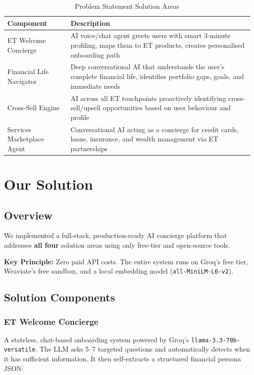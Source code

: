\documentclass[12pt,a4paper]{article}
\begin{document}
\begin{table}[H]
\centering
\caption{Problem Statement Solution Areas}
\begin{tabularx}{\textwidth}{lX}
\toprule
\textbf{Component} & \textbf{Description} \\
\midrule
ET Welcome Concierge & AI voice/chat agent greets users with smart 3-minute profiling, maps them to ET products, creates personalised onboarding path \\
\addlinespace
Financial Life Navigator & Deep conversational AI that understands the user's complete financial life, identifies portfolio gaps, goals, and immediate needs \\
\addlinespace
Cross-Sell Engine & AI across all ET touchpoints proactively identifying cross-sell/upsell opportunities based on user behaviour and profile \\
\addlinespace
Services Marketplace Agent & Conversational AI acting as a concierge for credit cards, loans, insurance, and wealth management via ET partnerships \\
\bottomrule
\end{tabularx}
\end{table}

\section{Our Solution}

\subsection{Overview}

We implemented a full-stack, production-ready AI concierge platform that addresses \textbf{all four} solution areas using only free-tier and open-source tools.

\begin{highlight}
\textbf{Key Principle:} Zero paid API costs. The entire system runs on Groq's free tier, Weaviate's free sandbox, and a local embedding model (\texttt{all-MiniLM-L6-v2}).
\end{highlight}

\subsection{Solution Components}

\subsubsection{ET Welcome Concierge}
A stateless, chat-based onboarding system powered by Groq's \texttt{llama-3.3-70b-versatile}. The LLM asks 5–7 targeted questions and automatically detects when it has sufficient information. It then self-extracts a structured financial persona JSON:
\end{document}
